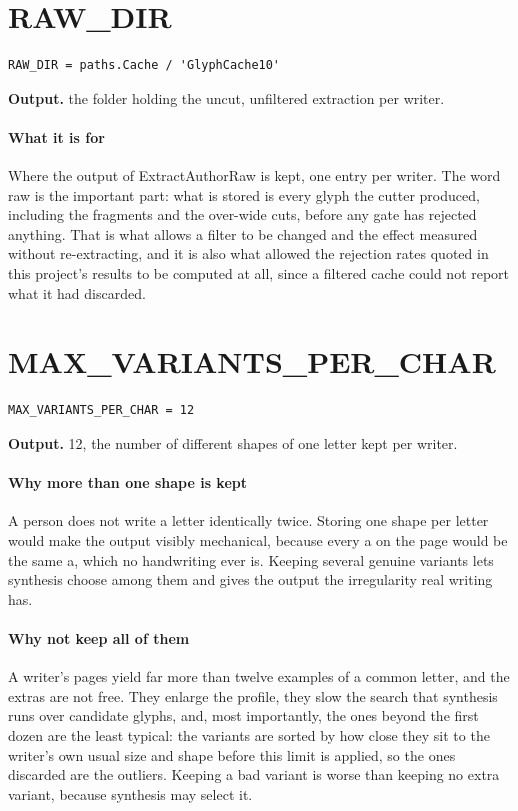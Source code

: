 \section{RAW\_DIR}
\begin{lstlisting}[style=sig]
RAW_DIR = paths.Cache / 'GlyphCache10'
\end{lstlisting}

\noindent\textbf{Output.} the folder holding the uncut, unfiltered extraction per writer.


\paragraph{What it is for}
Where the output of ExtractAuthorRaw is kept, one entry per writer. The word raw is the important part: what is stored is every glyph the cutter produced, including the fragments and the over-wide cuts, before any gate has rejected anything. That is what allows a filter to be changed and the effect measured without re-extracting, and it is also what allowed the rejection rates quoted in this project's results to be computed at all, since a filtered cache could not report what it had discarded.


\section{MAX\_VARIANTS\_PER\_CHAR}
\begin{lstlisting}[style=sig]
MAX_VARIANTS_PER_CHAR = 12
\end{lstlisting}

\noindent\textbf{Output.} 12, the number of different shapes of one letter kept per writer.


\paragraph{Why more than one shape is kept}
A person does not write a letter identically twice. Storing one shape per letter would make the output visibly mechanical, because every a on the page would be the same a, which no handwriting ever is. Keeping several genuine variants lets synthesis choose among them and gives the output the irregularity real writing has.


\paragraph{Why not keep all of them}
A writer's pages yield far more than twelve examples of a common letter, and the extras are not free. They enlarge the profile, they slow the search that synthesis runs over candidate glyphs, and, most importantly, the ones beyond the first dozen are the least typical: the variants are sorted by how close they sit to the writer's own usual size and shape before this limit is applied, so the ones discarded are the outliers. Keeping a bad variant is worse than keeping no extra variant, because synthesis may select it.


